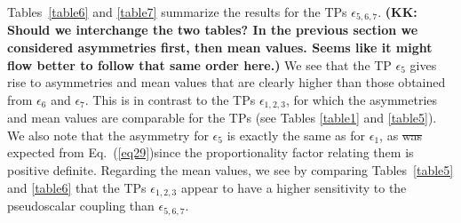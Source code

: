 \documentclass[aps,preprint,tightenlines,floatfix,superscriptaddress,nofootinbib,showpacs]{revtex4-1}
\providecommand{\DIFadd}[1]{{\protect\color{blue}\uwave{#1}}} %
\providecommand{\DIFdel}[1]{{\protect\color{red}\sout{#1}}}                      %
\providecommand{\DIFaddbegin}{} %
\providecommand{\DIFaddend}{} %
\providecommand{\DIFdelbegin}{} %
\providecommand{\DIFdelend}{} %
\begin{document}
Tables~\ref{table6} and
\ref{table7} summarize the results for the TPs $\epsilon_{5,6,7}$.
    {\bf (KK: Should we interchange the two tables?  In the previous section
      we considered asymmetries first, then mean values.  Seems like it might
      flow better to follow that same order here.)}
We see that the TP $\epsilon_5$ gives rise to asymmetries and mean
values that are clearly higher than those obtained from $\epsilon_6$
and $\epsilon_7$. This is in contrast to the TPs $\epsilon_{1,2,3}$,
for which the asymmetries and mean values are comparable for the TPs
(see Tables
\ref{table1} and \ref{table5}). We also note that the asymmetry for
$\epsilon_5$ is exactly the same as for $\epsilon_1$, as \DIFdelbegin \DIFdel{was }\DIFdelend \DIFaddbegin \DIFadd{is }\DIFaddend expected
from Eq.~(\ref{eq29})\DIFaddbegin \DIFadd{, }\DIFaddend since the proportionality factor relating them
is positive definite. Regarding the mean values, we see by comparing
Tables~\ref{table5} and \ref{table6} that the TPs $\epsilon_{1,2,3}$
appear to have a higher sensitivity to the pseudoscalar coupling than
$\epsilon_{5,6,7}$.  \par
\DIFaddbegin 
\end{document}
